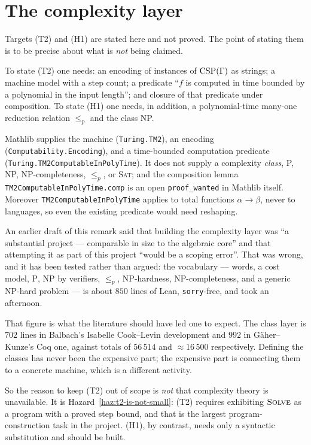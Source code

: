 \section{The complexity layer}\label{sec:complexity-layer}

Targets \textup{(T2)} and \textup{(H1)} are stated here and not proved. The
point of stating them is to be precise about what is \emph{not} being claimed.

\begin{definition}\label{def:cost-model}
To state \textup{(T2)} one needs: an encoding of instances of $\operatorname{CSP}(\Gamma)$ as
strings; a machine model with a step count; a predicate ``$f$ is computed in
time bounded by a polynomial in the input length''; and closure of that
predicate under composition. To state \textup{(H1)} one needs, in addition, a
polynomial-time many-one reduction relation $\le_{p}$ and the class
\textup{NP}.
\end{definition}

Mathlib supplies the machine (\texttt{Turing.TM2}), an encoding
(\texttt{Computability.Encoding}), and a time-bounded computation predicate
(\texttt{Turing.TM2ComputableInPolyTime}). It does not supply a complexity
\emph{class}, \textup{P}, \textup{NP}, \textup{NP}-completeness, $\le_{p}$, or
\textsc{Sat}; and the composition lemma
\texttt{TM2ComputableInPolyTime.comp} is an open \texttt{proof\_wanted} in
Mathlib itself. Moreover \texttt{TM2ComputableInPolyTime} applies to total
functions $\alpha\to\beta$, never to languages, so even the existing predicate
would need reshaping.

\begin{remark}\label{rem:complexity-scope}
An earlier draft of this remark said that building the complexity layer was
``a substantial project --- comparable in size to the algebraic core'' and that
attempting it as part of this project ``would be a scoping error''. That was
wrong, and it has been tested rather than argued: the vocabulary --- words, a
cost model, $\mathrm P$, $\mathrm{NP}$ by verifiers, $\le_{p}$,
\textup{NP}-hardness, \textup{NP}-completeness, and a generic
\textup{NP}-hard problem --- is about $850$ lines of Lean, \texttt{sorry}-free,
and took an afternoon.

That figure is what the literature should have led one to expect. The class
layer is $702$ lines in Balbach's Isabelle Cook--Levin development and $992$ in
G\"aher--Kunze's Coq one, against totals of $56\,514$ and $\approx 16\,500$
respectively. Defining the classes has never been the expensive part; the
expensive part is connecting them to a concrete machine, which is a different
activity.

So the reason to keep \textup{(T2)} out of scope is \emph{not} that complexity
theory is unavailable. It is Hazard~\ref{haz:t2-is-not-small}: \textup{(T2)}
requires exhibiting $\textsc{Solve}$ as a program with a proved step bound, and
that is the largest program-construction task in the project. \textup{(H1)},
by contrast, needs only a syntactic substitution and should be built.
\end{remark}

